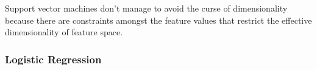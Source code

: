 Support vector machines don't manage to avoid the curse of dimensionality because there are constraints amongst the feature values that restrict the effective dimensionality of feature space.

\subsubsection{Logistic Regression}












